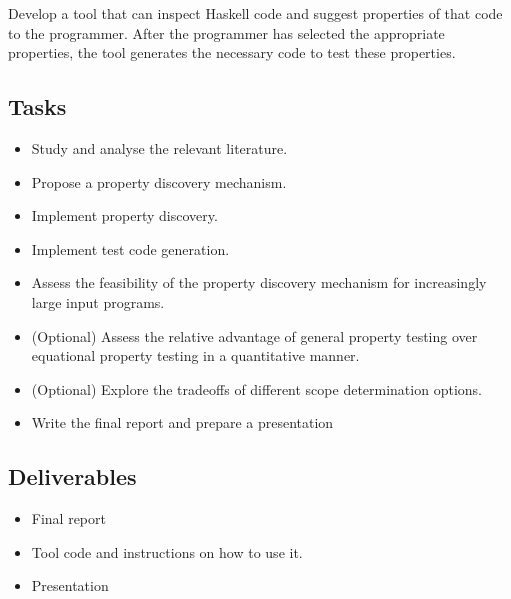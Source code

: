 \documentclass[a4paper, 11pt, onepage]{article}
\begin{document}
Develop a tool that can inspect Haskell code and suggest properties of that code to the programmer.
After the programmer has selected the appropriate properties, the tool generates the necessary code to test these properties.


\subsection{Tasks}

\begin{itemize}
  \item Study and analyse the relevant literature.
  \item Propose a property discovery mechanism.
  \item Implement property discovery.
  \item Implement test code generation.
  \item Assess the feasibility of the property discovery mechanism for increasingly large input programs.
  \item (Optional) Assess the relative advantage of general property testing over equational property testing in a quantitative manner.
  \item (Optional) Explore the tradeoffs of different scope determination options.
  \item Write the final report and prepare a presentation
\end{itemize}


\subsection{Deliverables}

\begin{itemize}
  \item Final report
  \item Tool code and instructions on how to use it.
  \item Presentation
\end{itemize}




\end{document}
